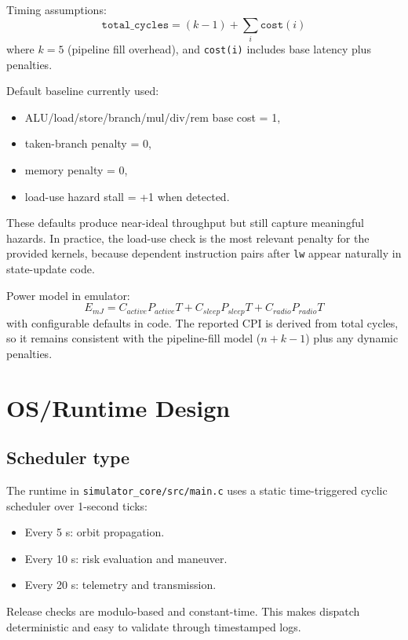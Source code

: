 \documentclass[11pt,a4paper]{article}
\begin{document}
Timing assumptions:
\begin{equation}
\texttt{total\_cycles} = (k-1) + \sum_i \texttt{cost}(i)
\end{equation}
where $k=5$ (pipeline fill overhead), and \texttt{cost(i)} includes base latency plus penalties.

Default baseline currently used:
\begin{itemize}[leftmargin=1.5em]
    \item ALU/load/store/branch/mul/div/rem base cost = 1,
    \item taken-branch penalty = 0,
    \item memory penalty = 0,
    \item load-use hazard stall = +1 when detected.
\end{itemize}
These defaults produce near-ideal throughput but still capture meaningful hazards. In practice, the load-use check is the most relevant penalty for the provided kernels, because dependent instruction pairs after \texttt{lw} appear naturally in state-update code.

Power model in emulator:
\begin{equation}
E_{mJ} = C_{active}P_{active}T + C_{sleep}P_{sleep}T + C_{radio}P_{radio}T
\end{equation}
with configurable defaults in code.
The reported CPI is derived from total cycles, so it remains consistent with the pipeline-fill model ($n + k - 1$) plus any dynamic penalties.

\section{OS/Runtime Design}
\subsection*{Scheduler type}
The runtime in \texttt{simulator\_core/src/main.c} uses a static time-triggered cyclic scheduler over 1-second ticks:
\begin{itemize}[leftmargin=1.5em]
    \item Every 5 s: orbit propagation.
    \item Every 10 s: risk evaluation and maneuver.
    \item Every 20 s: telemetry and transmission.
\end{itemize}
Release checks are modulo-based and constant-time. This makes dispatch deterministic and easy to validate through timestamped logs.
\end{document}
